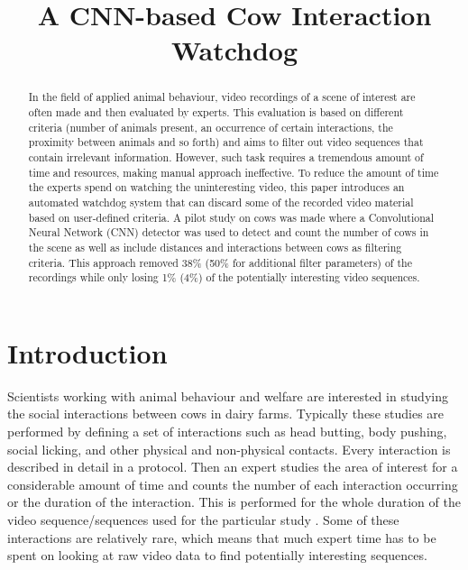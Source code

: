\documentclass{cta-author}
\begin{document}
\title{A CNN-based Cow Interaction Watchdog}

\author{   }
\address{
}


\begin{abstract}
In the field of applied animal behaviour, video recordings of a scene of interest are often made and then 
evaluated by experts. This evaluation is based on different criteria (number of animals present, an 
occurrence of certain interactions, the proximity between animals and so forth) and aims to filter out video 
sequences that contain irrelevant information.  However,  such task requires a tremendous amount of time and 
resources, making manual approach ineffective. To reduce the amount of time the experts spend on watching the 
uninteresting video, this paper introduces an automated watchdog system that can discard some of the recorded 
video material based on user-defined criteria. A pilot study on cows was made where a Convolutional Neural 
Network (CNN) detector was used to detect and count the number of cows in the scene as well as include 
distances and interactions between cows as filtering criteria. This approach removed 38\% (50\% for 
additional filter parameters) of the recordings while only losing 1\% (4\%) of the potentially interesting 
video sequences. 
\end{abstract}

\maketitle

\section{Introduction}

Scientists working with animal behaviour and welfare are interested in studying the social interactions 
between cows in dairy farms. Typically these studies are performed by defining a set of interactions such as 
head butting, body pushing, social licking, and other physical and non-physical contacts. Every interaction 
is described in detail in a protocol. Then an expert studies the area of interest for a considerable amount 
of time and counts the number of each interaction occurring or the duration of the interaction. This is 
performed for the whole duration of the video sequence/sequences used for the particular study 
\cite{MartinandBateson2007}. Some of these interactions are relatively rare, which means that much expert 
time has to be spent on looking at raw video data to find potentially interesting sequences.
\end{document}
